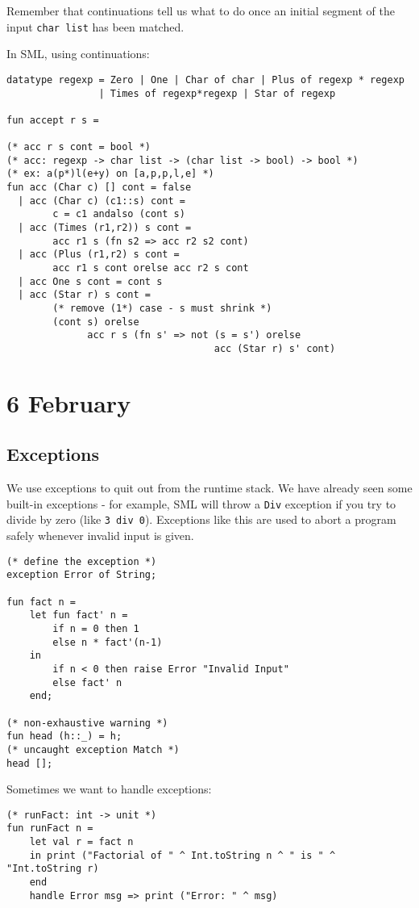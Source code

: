 \documentclass[11pt]{article}
\begin{document}
Remember that continuations tell us what to do once an initial segment of the input \verb~char list~ has been matched.

In SML, using continuations:
\begin{verbatim}
datatype regexp = Zero | One | Char of char | Plus of regexp * regexp
                | Times of regexp*regexp | Star of regexp

fun accept r s = 

(* acc r s cont = bool *)
(* acc: regexp -> char list -> (char list -> bool) -> bool *)
(* ex: a(p*)l(e+y) on [a,p,p,l,e] *)
fun acc (Char c) [] cont = false
  | acc (Char c) (c1::s) cont = 
        c = c1 andalso (cont s)
  | acc (Times (r1,r2)) s cont =
        acc r1 s (fn s2 => acc r2 s2 cont)
  | acc (Plus (r1,r2) s cont =
        acc r1 s cont orelse acc r2 s cont
  | acc One s cont = cont s
  | acc (Star r) s cont = 
        (* remove (1*) case - s must shrink *)
        (cont s) orelse
		      acc r s (fn s' => not (s = s') orelse 
			                        acc (Star r) s' cont)

\end{verbatim}

\section{6 February}
\subsection{Exceptions}

We use exceptions to quit out from the runtime stack. We have already seen some built-in exceptions - for example, SML will throw a \verb~Div~ exception if you try to divide by zero (like \verb~3 div 0~). Exceptions like this are used to abort a program safely whenever invalid input is given.

\begin{verbatim}
(* define the exception *)
exception Error of String;

fun fact n =
    let fun fact' n =
        if n = 0 then 1
        else n * fact'(n-1)
    in
        if n < 0 then raise Error "Invalid Input"
        else fact' n
    end;

(* non-exhaustive warning *)
fun head (h::_) = h;
(* uncaught exception Match *)
head []; 
\end{verbatim}

Sometimes we want to handle exceptions:

\begin{verbatim}
(* runFact: int -> unit *)
fun runFact n =
    let val r = fact n
    in print ("Factorial of " ^ Int.toString n ^ " is " ^ "Int.toString r)
    end
    handle Error msg => print ("Error: " ^ msg)
\end{verbatim}
\end{document}
